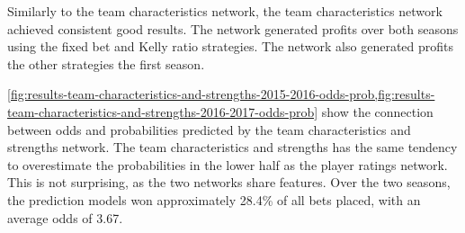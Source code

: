 Similarly to the team characteristics network, the team characteristics network achieved consistent good results. The network generated profits over both seasons using the fixed bet and Kelly ratio strategies. The network also generated profits the other strategies the first season.

\cref{fig:results-team-characteristics-and-strengths-2015-2016-odds-prob,fig:results-team-characteristics-and-strengths-2016-2017-odds-prob} show the connection between odds and probabilities predicted by the team characteristics and strengths network. The team characteristics and strengths has the same tendency to overestimate the probabilities in the lower half as the player ratings network. This is not surprising, as the two networks share features. Over the two seasons, the prediction models won approximately 28.4\% of all bets placed, with an average odds of 3.67.